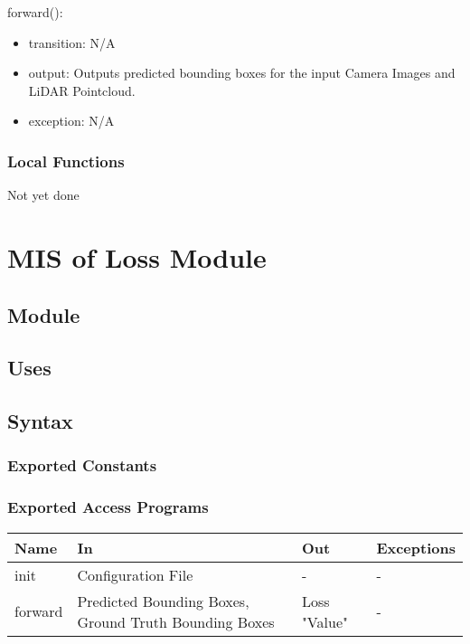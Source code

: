 \documentclass[12pt, titlepage]{article}
\begin{document}
\noindent forward():
\begin{itemize}
\item transition: N/A
\item output: Outputs predicted bounding boxes for the input Camera Images and LiDAR Pointcloud.
\item exception: N/A
\end{itemize}

\subsubsection{Local Functions}

Not yet done

\newpage

\section{MIS of Loss Module} \label{Module} 

\subsection{Module}



\subsection{Uses}


\subsection{Syntax}



\subsubsection{Exported Constants}



\subsubsection{Exported Access Programs}

\begin{center}
\begin{tabular}{p{2cm} p{4cm} p{4cm} p{2cm}}
\hline
\textbf{Name} & \textbf{In} & \textbf{Out} & \textbf{Exceptions} \\
\hline
init & Configuration File & - & - \\
\hline
forward & Predicted Bounding Boxes, Ground Truth Bounding Boxes & Loss "Value" & - \\
\hline
\end{tabular}
\end{center}
\end{document}
